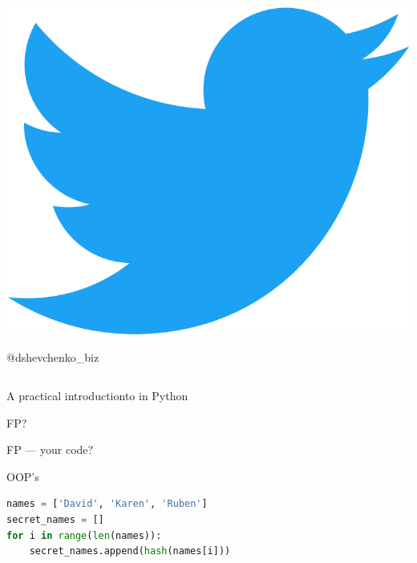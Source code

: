 \documentclass[aspectratio=169]{beamer}
\begin{document}
\begin{frame}
\begin{columns}[c]
\begin{column}[c]{15em}
            \begin{minipage}{1.5em}
                \includegraphics[scale=0.02]{img/twitter.png}
            \end{minipage}
            \begin{minipage}{6em}
                \large
                    @dshevchenko\_biz
            \end{minipage}

            \vspace{5em}
        \end{column}
    \end{columns}
\end{frame}

\begin{frame}
    \HUGE
        A practical introduction\newline to  in Python
\end{frame}

\begin{frame}
    \centering
        \HUGE
            FP?
\end{frame}

\begin{frame}
    \HUGE
        FP ---  your code?
\end{frame}

\begin{frame}[fragile,t]
    \vspace{0.8em}
    \Huge{OOP's }

    \begin{lstlisting}[language=Python]
names = ['David', 'Karen', 'Ruben']
secret_names = []
for i in range(len(names)):
    secret_names.append(hash(names[i]))
    \end{lstlisting}
\end{frame}
\end{document}
